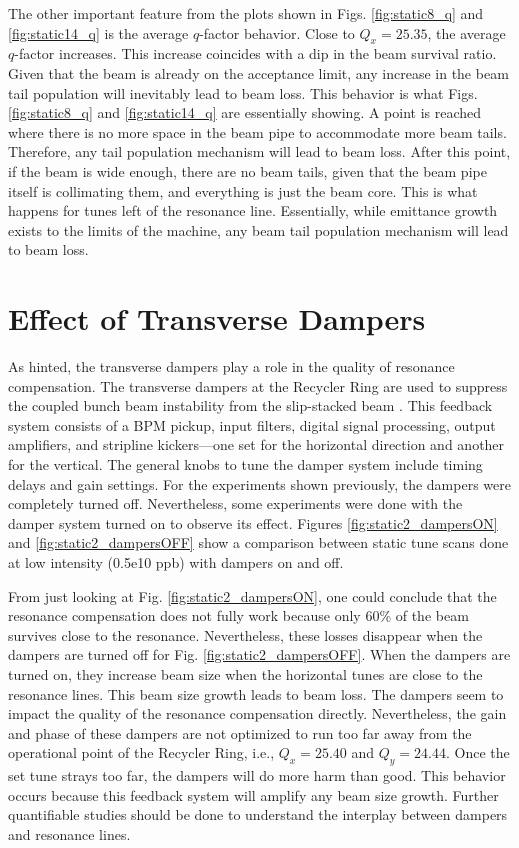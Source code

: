 The other important feature from the plots shown in Figs. \ref{fig:static8_q} and \ref{fig:static14_q} is the average $q$-factor behavior. Close to $Q_x=25.35$, the average $q$-factor increases. This increase coincides with a dip in the beam survival ratio. Given that the beam is already on the acceptance limit, any increase in the beam tail population will inevitably lead to beam loss. This behavior is what Figs. \ref{fig:static8_q} and \ref{fig:static14_q} are essentially showing. A point is reached where there is no more space in the beam pipe to accommodate more beam tails. Therefore, any tail population mechanism will lead to beam loss. After this point, if the beam is wide enough, there are no beam tails, given that the beam pipe itself is collimating them, and everything is just the beam core. This is what happens for tunes left of the resonance line. Essentially, while emittance growth exists to the limits of the machine, any beam tail population mechanism will lead to beam loss. 

\section{\label{sec:ch6dampers}Effect of Transverse Dampers}

As hinted, the transverse dampers play a role in the quality of resonance compensation. The transverse dampers at the Recycler Ring are used to suppress the coupled bunch beam instability from the slip-stacked beam \cite{dampers1,dampers2}. This feedback system consists of a BPM pickup, input filters, digital signal processing, output amplifiers, and stripline kickers—one set for the horizontal direction and another for the vertical. The general knobs to tune the damper system include timing delays and gain settings. For the experiments shown previously, the dampers were completely turned off. Nevertheless, some experiments were done with the damper system turned on to observe its effect. Figures \ref{fig:static2_dampersON} and \ref{fig:static2_dampersOFF} show a comparison between static tune scans done at low intensity (0.5e10 ppb) with dampers on and off.

From just looking at Fig. \ref{fig:static2_dampersON}, one could conclude that the resonance compensation does not fully work because only 60\% of the beam survives close to the resonance. Nevertheless, these losses disappear when the dampers are turned off for Fig. \ref{fig:static2_dampersOFF}. When the dampers are turned on, they increase beam size when the horizontal tunes are close to the resonance lines. This beam size growth leads to beam loss. The dampers seem to impact the quality of the resonance compensation directly. Nevertheless, the gain and phase of these dampers are not optimized to run too far away from the operational point of the Recycler Ring, i.e., $Q_x = 25.40$ and $Q_y=24.44$. Once the set tune strays too far, the dampers will do more harm than good. This behavior occurs because this feedback system will amplify any beam size growth. Further quantifiable studies should be done to understand the interplay between dampers and resonance lines.


